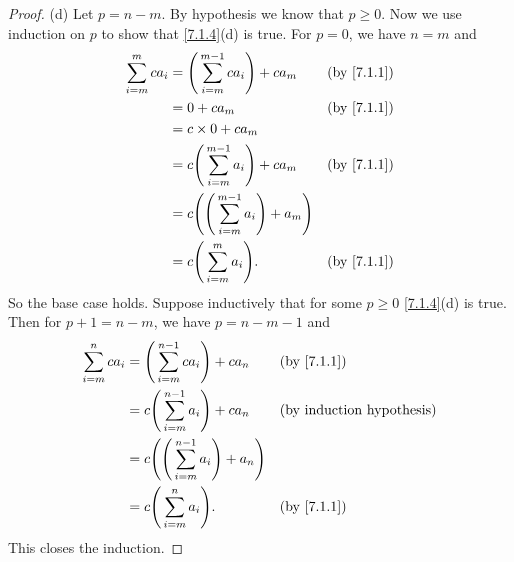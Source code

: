 \begin{proof}{(d)}
  Let \(p = n - m\).
  By hypothesis we know that \(p \geq 0\).
  Now we use induction on \(p\) to show that \cref{7.1.4}(d) is true.
  For \(p = 0\), we have \(n = m\) and
  \begin{align*}
    \sum_{i = m}^m ca_i & = \Bigg(\sum_{i = m}^{m - 1} ca_i\Bigg) + ca_m             &  & \text{(by \cref{7.1.1})} \\
                        & = 0 + ca_m                                                 &  & \text{(by \cref{7.1.1})} \\
                        & = c \times 0 + ca_m                                                                      \\
                        & = c \Bigg(\sum_{i = m}^{m - 1} a_i\Bigg) + ca_m            &  & \text{(by \cref{7.1.1})} \\
                        & = c \Bigg(\Bigg(\sum_{i = m}^{m - 1} a_i\Bigg) + a_m\Bigg)                               \\
                        & = c \Bigg(\sum_{i = m}^m a_i\Bigg).                        &  & \text{(by \cref{7.1.1})}
  \end{align*}
  So the base case holds.
  Suppose inductively that for some \(p \geq 0\) \cref{7.1.4}(d) is true.
  Then for \(p + 1 = n - m\), we have \(p = n - m - 1\) and
  \begin{align*}
    \sum_{i = m}^n ca_i & = \Bigg(\sum_{i = m}^{n - 1} ca_i\Bigg) + ca_n             &  & \text{(by \cref{7.1.1})}         \\
                        & = c \Bigg(\sum_{i = m}^{n - 1} a_i\Bigg) + ca_n            &  & \text{(by induction hypothesis)} \\
                        & = c \Bigg(\Bigg(\sum_{i = m}^{n - 1} a_i\Bigg) + a_n\Bigg)                                       \\
                        & = c \Bigg(\sum_{i = m}^n a_i\Bigg).                        &  & \text{(by \cref{7.1.1})}
  \end{align*}
  This closes the induction.
\end{proof}

